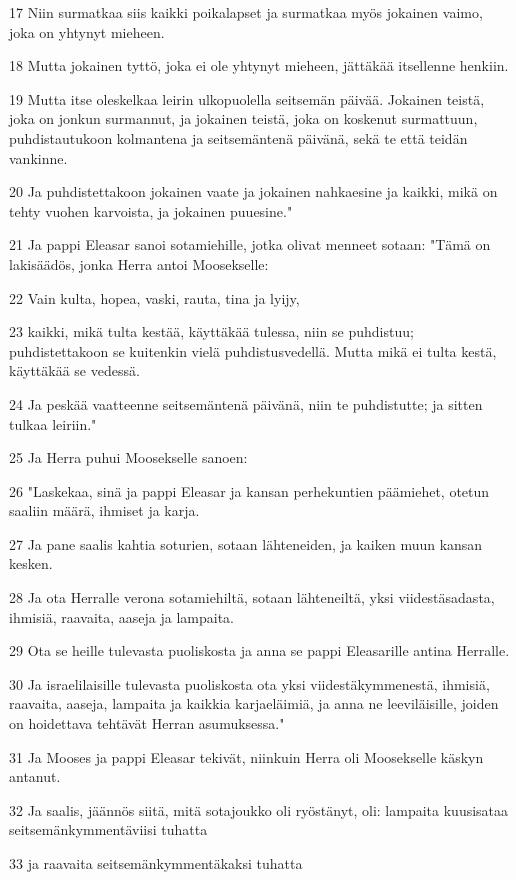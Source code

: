 \par 17 Niin surmatkaa siis kaikki poikalapset ja surmatkaa myös jokainen vaimo, joka on yhtynyt mieheen.
\par 18 Mutta jokainen tyttö, joka ei ole yhtynyt mieheen, jättäkää itsellenne henkiin.
\par 19 Mutta itse oleskelkaa leirin ulkopuolella seitsemän päivää. Jokainen teistä, joka on jonkun surmannut, ja jokainen teistä, joka on koskenut surmattuun, puhdistautukoon kolmantena ja seitsemäntenä päivänä, sekä te että teidän vankinne.
\par 20 Ja puhdistettakoon jokainen vaate ja jokainen nahkaesine ja kaikki, mikä on tehty vuohen karvoista, ja jokainen puuesine."
\par 21 Ja pappi Eleasar sanoi sotamiehille, jotka olivat menneet sotaan: "Tämä on lakisäädös, jonka Herra antoi Moosekselle:
\par 22 Vain kulta, hopea, vaski, rauta, tina ja lyijy,
\par 23 kaikki, mikä tulta kestää, käyttäkää tulessa, niin se puhdistuu; puhdistettakoon se kuitenkin vielä puhdistusvedellä. Mutta mikä ei tulta kestä, käyttäkää se vedessä.
\par 24 Ja peskää vaatteenne seitsemäntenä päivänä, niin te puhdistutte; ja sitten tulkaa leiriin."
\par 25 Ja Herra puhui Moosekselle sanoen:
\par 26 "Laskekaa, sinä ja pappi Eleasar ja kansan perhekuntien päämiehet, otetun saaliin määrä, ihmiset ja karja.
\par 27 Ja pane saalis kahtia soturien, sotaan lähteneiden, ja kaiken muun kansan kesken.
\par 28 Ja ota Herralle verona sotamiehiltä, sotaan lähteneiltä, yksi viidestäsadasta, ihmisiä, raavaita, aaseja ja lampaita.
\par 29 Ota se heille tulevasta puoliskosta ja anna se pappi Eleasarille antina Herralle.
\par 30 Ja israelilaisille tulevasta puoliskosta ota yksi viidestäkymmenestä, ihmisiä, raavaita, aaseja, lampaita ja kaikkia karjaeläimiä, ja anna ne leeviläisille, joiden on hoidettava tehtävät Herran asumuksessa."
\par 31 Ja Mooses ja pappi Eleasar tekivät, niinkuin Herra oli Moosekselle käskyn antanut.
\par 32 Ja saalis, jäännös siitä, mitä sotajoukko oli ryöstänyt, oli: lampaita kuusisataa seitsemänkymmentäviisi tuhatta
\par 33 ja raavaita seitsemänkymmentäkaksi tuhatta
